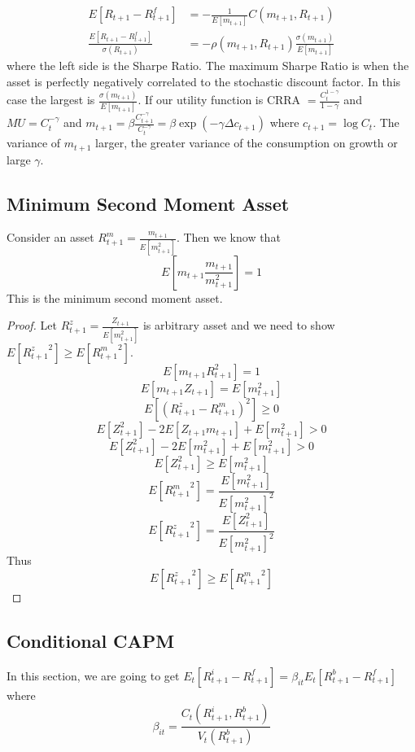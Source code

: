 \documentclass[11pt, a4paper, oneside]{article}
\theoremstyle{definition}
\theoremstyle{proposition}
\theoremstyle{corollary}
\theoremstyle{lemma}
\theoremstyle{theorem}
\begin{document}
\begin{align*}
E[R_{t+1} - R_{t+1}^f] &= -\frac{1}{E[m_{t+1}]} C(m_{t+1}, R_{t+1}) \\
\frac{E[R_{t+1} - R_{t+1}^f]}{\sigma(R_{t+1})} &= -\rho(m_{t+1}, R_{t+1}) \frac{\sigma(m_{t+1})}{E[m_{t+1}]} 
\end{align*}
where the left side is the Sharpe Ratio. The maximum Sharpe Ratio is when the asset is perfectly negatively correlated to the stochastic discount factor. In this case the largest is $\frac{\sigma(m_{t+1})}{E[m_{t+1}]}$. If our utility function is CRRA $=\frac{C_t^{1-\gamma}}{1- \gamma}$ and $MU = C_t^{-\gamma}$ and $m_{t+1} = \beta \frac{C_{t+1}^{-\gamma}}{C_t^{-\gamma}} = \beta\exp(-\gamma \Delta c_{t+1})$ where $c_{t+1} = \log{C_t}$. The variance of $m_{t+1}$ larger, the greater variance of the consumption on growth or large $\gamma$. 


\subsection{Minimum Second Moment Asset}
Consider an asset $R_{t+1}^m = \frac{m_{t+1}}{E[m_{t+1}^2]}$. Then we know that 
$$E\left[m_{t+1}\frac{m_{t+1}}{m_{t+1}^2}\right] = 1$$ 
This is the minimum second moment asset. 
\begin{proof}
Let $R^z_{t+1} = \frac{Z_{t+1}}{E[m_{t+1}^2]}$ is arbitrary asset and we need to show $E[{R_{t+1}^z}^2] \geq E[{R_{t+1}^m}^2]$. 
$$E[m_{t+1}R_{t+1}^2] = 1$$
$$E[m_{t+1}Z_{t+1}] = E[m_{t+1}^2]$$
$$E[(R_{t+1}^z - R_{t+1}^m)^2] \geq 0$$
$$E[Z_{t+1}^2] - 2E[Z_{t+1}m_{t+1}] + E[m_{t+1}^2] > 0$$
$$E[Z_{t+1}^2] - 2E[m_{t+1}^2] + E[m_{t+1}^2] > 0$$
$$E[Z_{t+1}^2] \geq E[m_{t+1}^2]$$
$$E[{R_{t+1}^m}^2] = \frac{E[m_{t+1}^2]}{E[m_{t+1}^2]^2}$$
$$E[{R_{t+1}^z}^2] = \frac{E[Z_{t+1}^2]}{E[m_{t+1}^2]^2}$$
Thus 
$$E[{R_{t+1}^z}^2]  \geq E[{R_{t+1}^m}^2]$$
\end{proof}

\subsection{Conditional CAPM}
In this section, we are going to get $E_t[R_{t+1}^i - R_{t+1}^f] = \beta_{it}E_t[R_{t+1}^b - R_{t+1}^f]$ where
$$\beta_{it} = \frac{C_t(R_{t+1}^i, R_{t+1}^b)}{V_t(R_{t+1}^b)}$$
\end{document}
